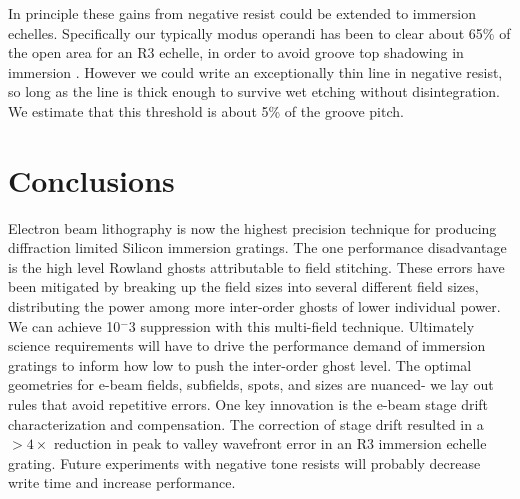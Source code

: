 \documentclass[]{spie}  %
\begin{document}
In principle these gains from negative resist could be extended to immersion echelles.  Specifically our typically modus operandi has been to clear about 65\% of the open area for an R3 echelle, in order to avoid groove top shadowing in immersion \cite{2012SPIE.8450E..2SG}.  However we could write an exceptionally thin line in negative resist, so long as the line is thick enough to survive wet etching without disintegration.  We estimate that this threshold is about 5\% of the groove pitch.  


\section{Conclusions}
Electron beam lithography is now the highest precision technique for producing diffraction limited Silicon immersion gratings.  The one performance disadvantage is the high level Rowland ghosts attributable to field stitching.  These errors have been mitigated by breaking up the field sizes into several different field sizes, distributing the power among more inter-order ghosts of lower individual power.  We can achieve 10$^-3$ suppression with this multi-field technique.  Ultimately science requirements will have to drive the performance demand of immersion gratings to inform how low to push the inter-order ghost level.  The optimal geometries for e-beam fields, subfields, spots, and sizes are nuanced- we lay out rules that avoid repetitive errors.  One key innovation is the e-beam stage drift characterization and compensation.  The correction of stage drift resulted in a $>4\times$ reduction in peak to valley wavefront error in an R3 immersion echelle grating.  Future experiments with negative tone resists will probably decrease write time and increase performance.


\end{document}
